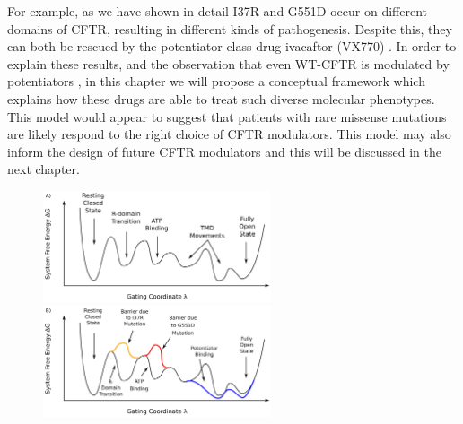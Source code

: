 For example, as we have shown in detail I37R and G551D occur on different domains of CFTR, resulting in different kinds of pathogenesis. Despite this, they can both be rescued by the potentiator class drug ivacaftor (VX770) \cite{vangoor2014,wong2022}. In order to explain these results, and the observation that even WT-CFTR is modulated by potentiators \cite{csanady2019}, in this chapter we will propose a conceptual framework which explains how these drugs are able to treat such diverse molecular phenotypes. This model would appear to suggest that patients with rare missense mutations are likely respond to the right choice of CFTR modulators. This model may also inform the design of future CFTR modulators and this will be discussed in the next chapter. 

\begin{figure}
	\begin{center}
		\begingroup
	\includegraphics[width=0.6\textwidth]{figures/perspective/drug_landscape_1.pdf}\\
	\includegraphics[width=0.6\textwidth]{figures/perspective/drug_landscape_3.pdf}\\
		\endgroup
	\end{center}
	\begingroup
	\captionsetup{singlelinecheck = false, justification=raggedright}

\end{figure}
